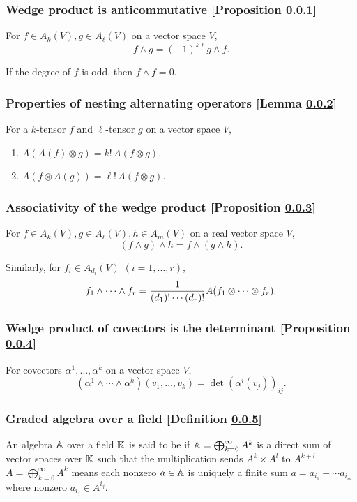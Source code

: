 \subsubsection{Wedge product is anticommutative [Proposition \ref{wedge-product-is-anticommutative}]}\label{wedge-product-is-anticommutative}
For $f \in A_k (V), g \in A_\ell(V)$ on a vector space $V$,
\[
f \wedge g = (-1)^{k\ell} g \wedge f.
\]

If the degree of $f$ is odd, then $f \wedge f = 0$.

\subsubsection{Properties of nesting alternating operators [Lemma \ref{properties-of-nesting-alternating-operators}]}\label{properties-of-nesting-alternating-operators}
For a $k$-tensor $f$ and $\ell$-tensor $g$ on a vector space $V$,
\begin{enumerate}
\item $A(A(f)\otimes g) = k!\,A(f\otimes g)$,
\item $A(f\otimes A(g)) = \ell!\,A(f\otimes g)$.    
\end{enumerate}

\subsubsection{Associativity of the wedge product [Proposition \ref{associativity-of-the-wedge-product}]}\label{associativity-of-the-wedge-product}
For $f \in A_k(V), g \in A_\ell(V), h \in A_m(V)$ on a real vector space $V$,
\[
(f \wedge g) \wedge h = f \wedge ( g \wedge h).
\]

Similarly, for $f_i \in A_{d_i}(V)$ $(i = 1, \dotsc, r)$,
\[
f_1 \wedge \dotsb \wedge f_r = \fr1{(d_1)!\dotsm (d_r)!} A(f_1 \otimes \dotsm \otimes f_r).
\]

\subsubsection{Wedge product of covectors is the determinant [Proposition \ref{wedge-product-of-covectors-is-the-determinant}]}\label{wedge-product-of-covectors-is-the-determinant}
For covectors $\alpha^1, \dotsc , \alpha^k$ on a vector space $V$,
\[
(\alpha^1\wedge \dotsm \wedge \alpha^k)(v_1,\dotsc, v_k) = \det (\alpha^i (v_j))_{ij}.
\]

\subsubsection{Graded algebra over a field [Definition \ref{graded-algebra-over-a-field}]}\label{graded-algebra-over-a-field}
An algebra $\mathbb{A}$ over a field $\mathbb{K}$ is said to be  if $\mathbb{A} = \bigoplus_{k = 0}^\infty A^k$ is a direct sum of vector spaces over $\mathbb{K}$ such that the multiplication sends $A^k \times A^l$ to $A^{k+l}$. $A = \bigoplus_{k = 0}^\infty A^k$ means each nonzero $a \in \mathbb{A}$ is uniquely a finite sum $a = a_{i_1} + \dotsb a_{i_m}$ where nonzero $a_{i_j} \in A^{i_j}$.

